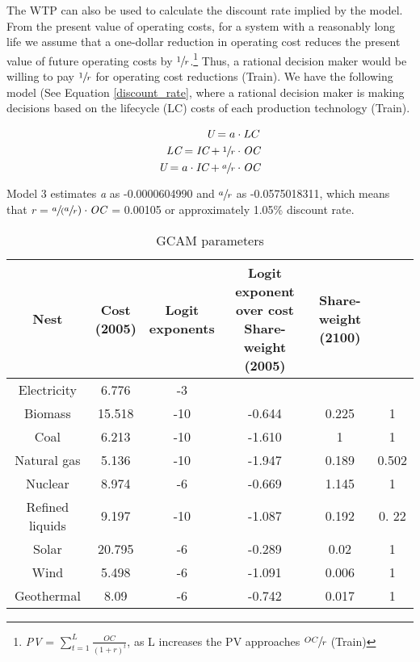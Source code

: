 \documentclass[10pt]{amsart}
\begin{document}
The WTP can also be used to calculate the discount rate implied by the model.
From the present value of operating costs, for a system with a reasonably long life we assume that a one-dollar reduction in operating cost reduces the present value of future operating costs by $\sfrac{1}{r}$.\footnote{\textit{PV} = $\sum_{t=1}^L \frac{OC}{(1+r)^t}$, as L increases the PV approaches $\sfrac{OC}{r}$ \parencite{}(Train)}
Thus, a rational decision maker would be willing to pay $\sfrac{1}{r}$ for operating cost reductions \parencite{}(Train). 
We have the following model (See Equation \ref{discount_rate}, where a rational decision maker is making decisions based on the lifecycle (LC) costs of each production technology \parencite{}(Train).

\begin{equation}\label{discount_rate}
\begin{split}
\textit{U} = a\cdot LC \\
\textit{LC} = \textit{IC} + \sfrac{1}{r}\cdot\textit{OC} \\
\textit{U} = a\cdot\textit{IC} + \sfrac{a}{r}\cdot\textit{OC}
\end{split}
\end{equation}

Model 3 estimates \textit{a} as -0.0000604990 and $\sfrac{a}{r}$ as -0.0575018311, which means that \textit{r} = $\sfrac{a}({\sfrac{a}{r}})\cdot\textit{OC}$ = 0.00105 or approximately 1.05\% discount rate.

\begin{table}
\caption{GCAM parameters}
\centering
\begin{tabular}{c c c c c c}
\hline
\hline
Nest & \makecell{Cost \\ (2005)} & \makecell{Logit \\ exponents} & \makecell{Logit exponent \\ over cost} \makecell{Share-weight \\ (2005)} & \makecell{Share-weight \\ (2100)} \\ [0.5ex]
\hline
Electricity & 6.776 & -3 & & &\\
\hline
\hline
Biomass & 15.518 & -10 & -0.644 & 0.225 & 1 \\
Coal & 6.213 & -10 & -1.610 & 1 & 1 \\
Natural gas & 5.136 & -10 & -1.947 & 0.189 & 0.502 \\
Nuclear & 8.974 & -6 & -0.669 & 1.145 & 1 \\
Refined liquids & 9.197 & -10 & -1.087 & 0.192 & 0. 22 \\
Solar & 20.795 & -6 & -0.289 & 0.02 & 1 \\
Wind & 5.498 & -6 & -1.091 & 0.006 & 1 \\
Geothermal & 8.09 & -6 & -0.742 & 0.017 & 1 \\ [1ex]
\hline
\end{tabular}
\label{table:nl.1}
\end{table}
\end{document}

